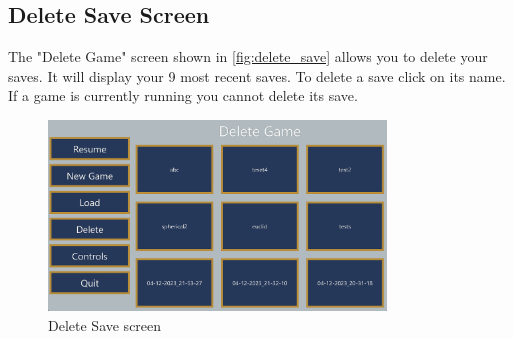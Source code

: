 \subsection{Delete Save Screen} \label{delete_save_screen}
The "Delete Game" screen shown in \autoref{fig:delete_save} allows you to delete your saves.
It will display your 9 most recent saves.
To delete a save click on its name.
If a game is currently running you cannot delete its save.

\begin{figure}[H]
    \centering
    \includegraphics[width=0.8\textwidth]{sections/user_manual/resources/delete-game.png}
    \caption{Delete Save screen}
    \label{fig:delete_save}
\end{figure}